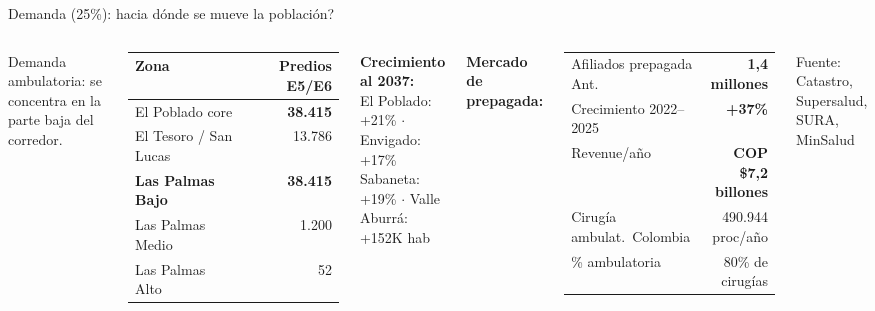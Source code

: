 \documentclass[aspectratio=169, 11pt]{beamer}
\begin{document}
\begin{frame}{\textcolor{dem}{Demanda (25\%)}: \textquestiondown hacia d\'{o}nde se mueve la poblaci\'{o}n?}

\begin{columns}[T]
\vspace{2pt}
{\scriptsize Demanda ambulatoria: se concentra en la parte baja del corredor.}

\vspace{3pt}
{\scriptsize
\begin{tabular}{@{}lr@{}}
\toprule
\textbf{Zona} & \textbf{Predios E5/E6} \\
\midrule
\rowcolor{acc!10}
El Poblado core & \textbf{38.415} \\
El Tesoro / San Lucas & 13.786 \\
\rowcolor{acc!8}
\textbf{Las Palmas Bajo} & \textbf{38.415} \\
Las Palmas Medio & 1.200 \\
Las Palmas Alto & 52 \\
\bottomrule
\end{tabular}
}

\vspace{3pt}
{\scriptsize\textbf{Crecimiento al 2037:}\\
El Poblado: +21\% $\cdot$ Envigado: +17\%\\
Sabaneta: +19\% $\cdot$ Valle Aburr\'{a}: +152K hab}

\vspace{2pt}
{\scriptsize\textbf{Mercado de prepagada:}}

\vspace{3pt}
{\scriptsize
\begin{tabular}{@{}lr@{}}
\toprule
Afiliados prepagada Ant. & \textcolor{dem}{\textbf{1,4 millones}} \\
Crecimiento 2022--2025 & \textcolor{dem}{\textbf{+37\%}} \\
Revenue/a\~{n}o & \textbf{COP \$7,2 billones} \\
\midrule
Cirug\'{i}a ambulat.\ Colombia & 490.944 proc/a\~{n}o \\
\% ambulatoria & 80\% de cirug\'{i}as \\
\bottomrule
\end{tabular}
}

\vspace{2pt}
{\tiny\color{slate} Fuente: Catastro, Supersalud, SURA, MinSalud}
\end{columns}
\end{frame}
\end{document}
